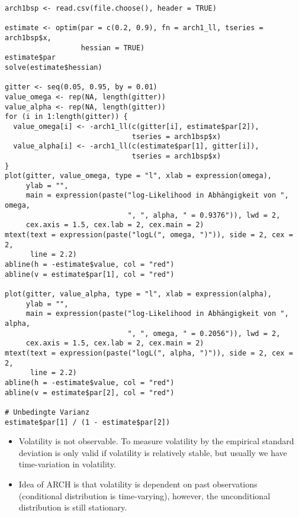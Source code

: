 \begin{Solution}{12.11}
\begin{verbatim}
arch1bsp <- read.csv(file.choose(), header = TRUE)

estimate <- optim(par = c(0.2, 0.9), fn = arch1_ll, tseries = arch1bsp$x,
                  hessian = TRUE)
estimate$par
solve(estimate$hessian)

gitter <- seq(0.05, 0.95, by = 0.01)
value_omega <- rep(NA, length(gitter))
value_alpha <- rep(NA, length(gitter))
for (i in 1:length(gitter)) {
  value_omega[i] <- -arch1_ll(c(gitter[i], estimate$par[2]),
                              tseries = arch1bsp$x)
  value_alpha[i] <- -arch1_ll(c(estimate$par[1], gitter[i]),
                              tseries = arch1bsp$x)
}
plot(gitter, value_omega, type = "l", xlab = expression(omega),
     ylab = "",
     main = expression(paste("log-Likelihood in Abhängigkeit von ", omega,
                             ", ", alpha, " = 0.9376")), lwd = 2,
     cex.axis = 1.5, cex.lab = 2, cex.main = 2)
mtext(text = expression(paste("logL(", omega, ")")), side = 2, cex = 2,
      line = 2.2)
abline(h = -estimate$value, col = "red")
abline(v = estimate$par[1], col = "red")

plot(gitter, value_alpha, type = "l", xlab = expression(alpha),
     ylab = "",
     main = expression(paste("log-Likelihood in Abhängigkeit von ", alpha,
                             ", ", omega, " = 0.2056")), lwd = 2,
     cex.axis = 1.5, cex.lab = 2, cex.main = 2)
mtext(text = expression(paste("logL(", alpha, ")")), side = 2, cex = 2,
      line = 2.2)
abline(h = -estimate$value, col = "red")
abline(v = estimate$par[2], col = "red")

# Unbedingte Varianz
estimate$par[1] / (1 - estimate$par[2])
\end{verbatim}
\begin{itemize}
\item Volatility is not observable. To measure volatility by the empirical standard deviation is only valid if volatility is relatively stable, but usually we have time-variation in volatility.
\item Idea of ARCH is that volatility is dependent on past observations (conditional distribution is time-varying), however, the unconditional distribution is still stationary.
\end{itemize}
\end{Solution}
